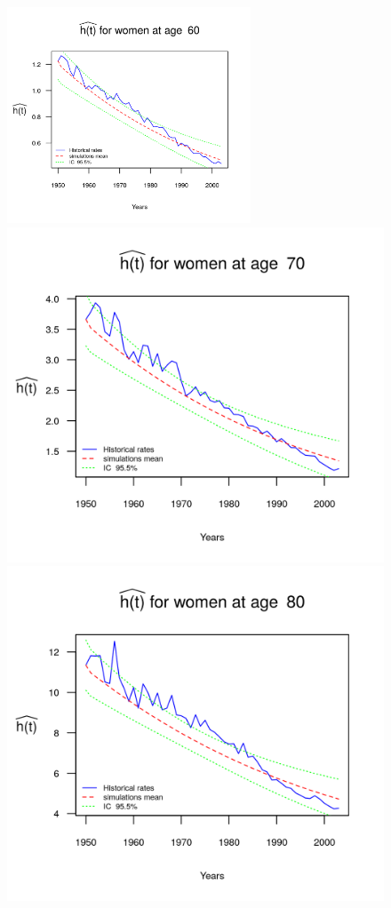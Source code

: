 \documentclass[smallextended]{svjour3}
\begin{document}
\begin{figure}[H]
    \includegraphics[width = 2.85in]{PlotWomen60.png}
    \includegraphics{PlotWomen70.png}
    \includegraphics{PlotWomen80.png}

\end{figure}
\end{document}
